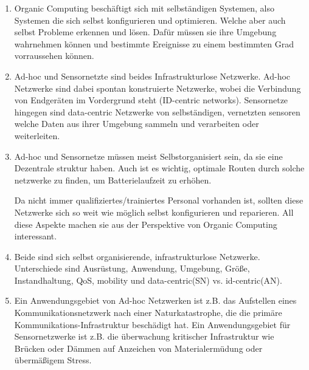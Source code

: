 
\date{Sonntag 10.05.2020}


    \maketitle
    \thispagestyle{fancy}

    \begin{enumerate}[label=\arabic*)]
        \item Organic Computing beschäftigt sich mit selbständigen Systemen, also Systemen die sich selbst konfigurieren und optimieren. Welche aber auch selbst Probleme erkennen und lösen. Dafür müssen sie ihre Umgebung wahrnehmen können und bestimmte Ereignisse zu einem bestimmten Grad vorraussehen können. 

        \item Ad-hoc und Sensornetzte sind beides Infrastrukturlose Netzwerke. Ad-hoc Netzwerke sind dabei spontan konstruierte Netzwerke, wobei die Verbindung von Endgeräten im Vordergrund steht (ID-centric networks). Sensornetze hingegen sind data-centric Netzwerke von selbständigen, vernetzten sensoren welche Daten aus ihrer Umgebung sammeln und verarbeiten oder weiterleiten.
        
        \item Ad-hoc und Sensornetze müssen meist Selbstorganisiert sein, da sie eine Dezentrale struktur haben. Auch ist es wichtig, optimale Routen durch solche netzwerke zu finden, um Batterielaufzeit zu erhöhen. 
        
        Da nicht immer qualifiziertes/trainiertes Personal vorhanden ist, sollten diese Netzwerke sich so weit wie möglich selbst konfigurieren und reparieren. All diese Aspekte machen sie aus der Perspektive von Organic Computing interessant.

        \item Beide sind sich selbst organisierende, infrastrukturlose Netzwerke. Unterschiede
        sind Ausrüstung, Anwendung, Umgebung, Größe, Instandhaltung,
        QoS, mobility und data-centric(SN) vs. id-centric(AN).

        \item Ein Anwendungsgebiet von Ad-hoc Netzwerken ist z.B. das Aufstellen eines Kommunikationsnetzwerk nach einer Naturkatastrophe, die die primäre Kommunikations-Infrastruktur beschädigt hat. Ein Anwendungsgebiet für Sensornetzwerke ist z.B. die überwachung kritischer Infrastruktur wie Brücken oder Dämmen auf Anzeichen von Materialermüdung oder übermäßigem Stress.
    \end{enumerate}

